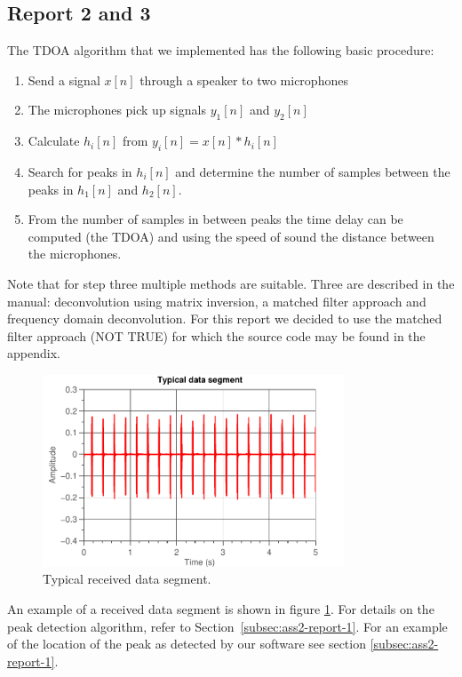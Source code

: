 \documentclass[11pt,titlepage]{report}
\begin{document}

\subsection{Report 2 and 3}
The TDOA algorithm that we implemented has the following basic procedure: 
\begin{enumerate}
\item Send a signal $x[n]$ through a speaker to two microphones
\item The microphones pick up signals $y_1[n]$ and $y_2[n]$
\item Calculate $h_i[n]$ from $y_i[n]=x[n]*h_i[n]$ 
\item Search for peaks in $h_i[n]$ and determine the number of samples between the peaks in $h_1[n]$ and $h_2[n]$.
\item From the number of samples in between peaks the time delay can be computed (the TDOA) and using the speed of sound the distance between the microphones.
\end{enumerate}
Note that for step three multiple methods are suitable. Three are described in the manual: deconvolution using matrix inversion, a matched filter approach and frequency domain deconvolution. For this report we decided to use the matched filter approach (NOT TRUE) for which the source code may be found in the appendix. %
\begin{figure}[H]
	\centering
	\includegraphics[width=0.8\textwidth]{../../deliverable-7-resources/figures/ass-2/report-2-3/ass-2-report-2-typical-data-segment.pdf}
	\caption{Typical received data segment.}
	\label{fig:ass-2-rep-2-data-segment}
\end{figure}

An example of a received data segment is shown in figure \ref{fig:ass-2-rep-2-data-segment}. For details on the peak detection algorithm, refer to Section~\ref{subsec:ass2-report-1}. For an example of the location of the peak as detected by our software see section \ref{subsec:ass2-report-1}.
\end{document}
